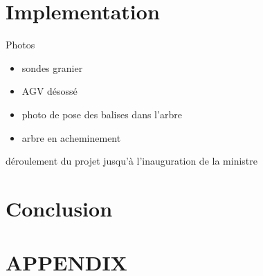\documentclass[letterpaper, 10 pt, conference]{IEEEtran}  %
\begin{document}
\section{Implementation}

Photos

\begin{itemize}
    \item sondes granier
    \item AGV désossé
    \item photo de pose des balises dans l’arbre
    \item arbre en acheminement
\end{itemize}


déroulement du projet
jusqu’à l’inauguration de la ministre




\section{Conclusion}


\addtolength{\textheight}{-12cm}   %
\section*{APPENDIX}
\end{document}
